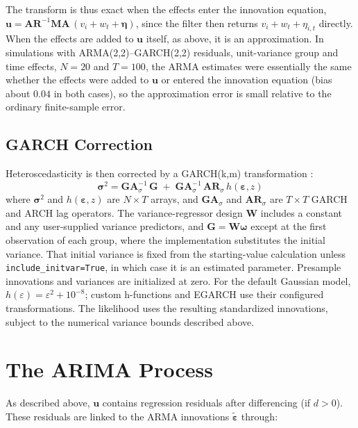 \documentclass[12pt]{article}
\begin{document}
The transform is thus exact when the effects enter the innovation equation, $\mathbf{u}=\mathbf{AR}^{-1}\mathbf{MA}\,(v_i+w_t+\boldsymbol{\eta})$, since the filter then returns $v_i+w_t+\eta_{i,t}$ directly. When the effects are added to $\mathbf{u}$ itself, as above, it is an approximation. In simulations with ARMA(2,2)--GARCH(2,2) residuals, unit-variance group and time effects, $N=20$ and $T=100$, the ARMA estimates were essentially the same whether the effects were added to $\mathbf{u}$ or entered the innovation equation (bias about $0.04$ in both cases), so the approximation error is small relative to the ordinary finite-sample error.

\subsection{GARCH Correction}

Heteroscedasticity is then corrected by a GARCH(k,m) transformation \citep{bollerslev1986generalized}:
\begin{equation}
\mathbf{\sigma}^{2}
= \mathbf{GA}_{\sigma}^{-1}\,\mathbf{G}
  \;+\;
  \mathbf{GA}_{\sigma}^{-1}\,\mathbf{AR}_{\sigma}\,h(\mathbf{\varepsilon},z)
\label{eq:garch_reduced}
\end{equation}
where $\mathbf{\sigma}^{2}$ and $h(\mathbf{\varepsilon},z)$ are $N \times T$ arrays, and $\mathbf{GA}_{\sigma}$ and $\mathbf{AR}_{\sigma}$ are $T \times T$ GARCH and ARCH lag operators. The variance-regressor design $\mathbf{W}$ includes a constant and any user-supplied variance predictors, and $\mathbf{G}=\mathbf{W}\boldsymbol{\omega}$ except at the first observation of each group, where the implementation substitutes the initial variance. That initial variance is fixed from the starting-value calculation unless \texttt{include\_initvar=True}, in which case it is an estimated parameter. Presample innovations and variances are initialized at zero. For the default Gaussian model, $h(\varepsilon)=\varepsilon^2+10^{-8}$; custom h-functions and EGARCH use their configured transformations. The likelihood uses the resulting standardized innovations, subject to the numerical variance bounds described above.

\section{The ARIMA Process}\label{the-arima-process}

As described above, $\mathbf{u}$ contains regression residuals after differencing (if $d>0$). These residuals are linked to the ARMA innovations $\tilde{\boldsymbol{\varepsilon}}$ through:
\end{document}
